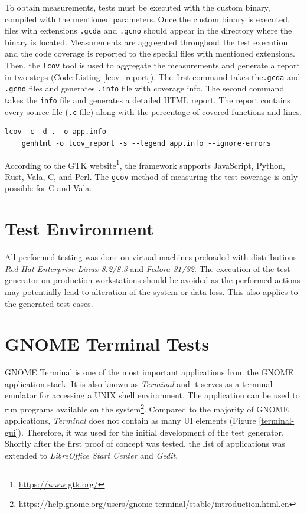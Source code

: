 To obtain measurements, tests must be executed with the custom binary, compiled with the mentioned parameters. Once the custom binary is executed, files with extensions \texttt{.gcda} and \texttt{.gcno} should appear in the directory where the binary is located. Measurements are aggregated throughout the test execution and the code coverage is reported to the special files with mentioned extensions. Then, the \texttt{lcov} tool is used to aggregate the measurements and generate a report in two steps (Code Listing \ref{lcov_report}). The first command takes the\texttt{.gcda} and \texttt{.gcno} files and generates \texttt{.info} file with coverage info. The second command takes the \texttt{info} file and generates a detailed HTML report. The report contains every source file (\texttt{.c} file) along with the percentage of covered functions and lines.

\begin{lstlisting}[language=Gherkin,caption={Shell commands used to generate an HTML report with \texttt{lcov} tool},label={lcov_report}]
    lcov -c -d . -o app.info
    genhtml -o lcov_report -s --legend app.info --ignore-errors
\end{lstlisting}

According to the GTK website\footnote{\url{https://www.gtk.org/}}, the framework supports JavaScript, Python, Rust, Vala, C, and Perl. The \verb|gcov| method of measuring the test coverage is only possible for C and Vala.    
\section{Test Environment}
All performed testing was done on virtual machines preloaded with distributions \textit{Red Hat Enterprise Linux 8.2/8.3} and \textit{Fedora 31/32}. The execution of the test generator on production workstations should be avoided as the performed actions may potentially lead to alteration of the system or data loss.  This also applies to the generated test cases. 

\section{GNOME Terminal Tests}
GNOME Terminal is one of the most important applications from the GNOME application stack. It is also known as \textit{Terminal} and it serves as a terminal emulator for accessing a UNIX shell environment. The application can be used to run programs available on the system\footnote{\url{https://help.gnome.org/users/gnome-terminal/stable/introduction.html.en}}. Compared to the majority of GNOME applications, \textit{Terminal} does not contain as many UI elements (Figure \ref{terminal-gui}). Therefore, it was used for the initial development of the test generator. Shortly after the first proof of concept was tested, the list of applications was extended to \textit{LibreOffice Start Center} and \textit{Gedit}. 

